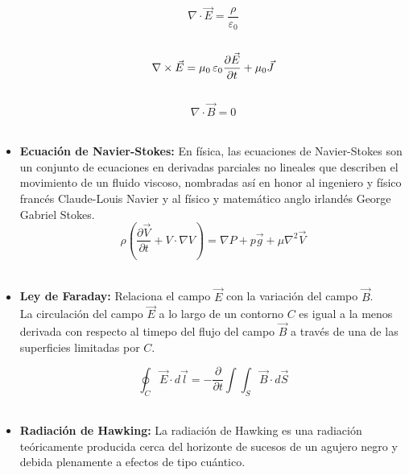 \documentclass[letterpaper, 12pt]{article}
\begin{document}
\begin{itemize}
            \begin{equation}
                \nabla \cdot \Vec{E} = \frac{\rho}{\varepsilon_{0}}
            \end{equation}\\
            
            \begin{equation}
                \nabla \times \Vec{E} = \mu _{0} \thinspace \varepsilon _{0} \frac{\partial \Vec{E}}{\partial t} + \mu _{0} \Vec{J}
            \end{equation}\\
            
            \begin{equation}
                \nabla \cdot \Vec{B} = 0
            \end{equation}\\
            
        \item \textbf{Ecuación de Navier-Stokes:} En física, las ecuaciones de Navier-Stokes son un conjunto de ecuaciones en derivadas parciales no lineales que describen el movimiento de un fluido viscoso, nombradas así en honor al ingeniero y físico francés Claude-Louis Navier y al físico y matemático anglo irlandés George Gabriel Stokes. \\
        
            \begin{equation*}
                \rho \left(\frac{\partial \Vec{V}}{\partial t} + V \cdot \nabla V \right) = \nabla P + p \Vec{g} + \mu \nabla ^2 \Vec{V}
            \end{equation*}\\
            
        \item \textbf{Ley de Faraday:} Relaciona el campo $\Vec{E}$ con la variación del campo $\Vec{B}$.\\
        La circulación del campo $\Vec{E}$ a lo largo de un contorno $C$ es igual a la menos derivada con respecto al timepo del flujo del campo $\Vec{B}$ a través de una de las superficies limitadas por $C$.
        
            \begin{equation*}
                \oint_{C} \Vec{E} \cdot d \Vec{l} = -\frac{\partial}{\partial t} \int \int_{S} \Vec{B} \cdot d \Vec{S} 
            \end{equation*}\\
            
        \item \textbf{Radiación de Hawking:} La radiación de Hawking es una radiación teóricamente producida cerca del horizonte de sucesos de un agujero negro y debida plenamente a efectos de tipo cuántico.  \\
        

\end{itemize}
\end{document}
